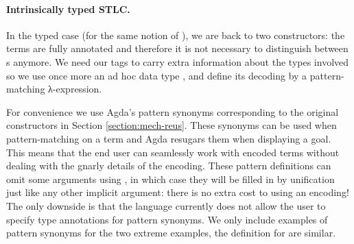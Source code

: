 \noindent
\begin{minipage}{0.95\textwidth}
\begin{minipage}[t]{0.3\textwidth}
\end{minipage}\quad
\begin{minipage}[t]{0.65\textwidth}
\end{minipage}
\end{minipage}

\paragraph*{Intrinsically typed STLC.}\label{par:intrinsicSTLC}
In the typed case (for the same notion of ), we are back to two
constructors: the terms are fully annotated and therefore it is not necessary
to distinguish between s anymore. We need our tags to carry extra
information about the types involved so we use once more an ad hoc data type
, and define its decoding  by a pattern-matching λ-expression.

\noindent
\begin{minipage}{0.95\textwidth}
\begin{minipage}[t]{0.48\textwidth}
\end{minipage}
\begin{minipage}[t]{0.515\textwidth}
\end{minipage}
\end{minipage}

For convenience we use Agda's pattern synonyms corresponding to the
original constructors in Section \ref{section:mech-reus}. These
synonyms can be used when pattern-matching on a term and Agda resugars
them when displaying a goal. This means that the end user can
seamlessly work with encoded terms without dealing with the gnarly
details of the encoding.  These pattern definitions can omit some
arguments using \codequote{\AS{\_}}, in which case they will be filled in
by unification just like any other implicit argument: there is no
extra cost to using an encoding!  The only downside is that the
language currently does not allow the user to specify type annotations
for pattern synonyms. We only include examples of pattern synonyms
for the two extreme examples, the definition for  are similar.

